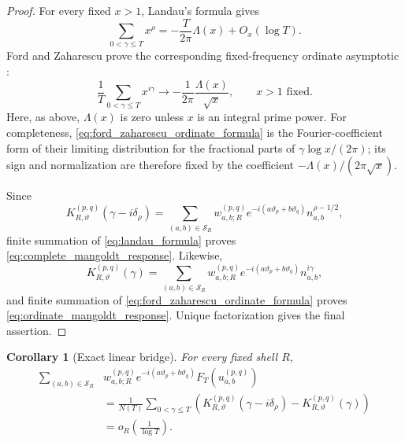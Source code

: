 \documentclass[11pt]{amsart}
\numberwithin{equation}{section}
\theoremstyle{plain}
\newtheorem{corollary}[theorem]{Corollary}
\theoremstyle{definition}
\theoremstyle{remark}
\begin{document}
\begin{proof}
For every fixed $x>1$, Landau's formula gives \cite{Titchmarsh1986}
\begin{equation}
\sum_{0<\gamma\leq T}x^\rho
=
-\frac{T}{2\pi}\Lambda(x)+O_x(\log T).
\label{eq:landau_formula}
\end{equation}
Ford and Zaharescu prove the corresponding fixed-frequency ordinate asymptotic
\cite{FordZaharescu2005}:
\begin{equation}
\frac{1}{T}
\sum_{0<\gamma\leq T}x^{i\gamma}
\longrightarrow
-\frac{1}{2\pi}\frac{\Lambda(x)}{\sqrt{x}},
\qquad x>1 \text{ fixed}.
\label{eq:ford_zaharescu_ordinate_formula}
\end{equation}
Here, as above, $\Lambda(x)$ is zero unless $x$ is an integral prime power.
For completeness, \eqref{eq:ford_zaharescu_ordinate_formula} is the Fourier-coefficient
form of their limiting distribution for the fractional parts of
$\gamma\log x/(2\pi)$; its sign and normalization are therefore fixed by the
coefficient $-\Lambda(x)/(2\pi\sqrt{x})$.

Since
\begin{equation}
K_{R,\vartheta}^{(p,q)}(\gamma-i\delta_\rho)
=
\sum_{(a,b)\in\mathcal S_R}
w_{a,b;R}^{(p,q)}e^{-i(a\vartheta_p+b\vartheta_q)}
n_{a,b}^{\rho-1/2},
\label{eq:complete_kernel_expansion}
\end{equation}
finite summation of \eqref{eq:landau_formula} proves
\eqref{eq:complete_mangoldt_response}.  Likewise,
\begin{equation}
K_{R,\vartheta}^{(p,q)}(\gamma)
=
\sum_{(a,b)\in\mathcal S_R}
w_{a,b;R}^{(p,q)}e^{-i(a\vartheta_p+b\vartheta_q)}
n_{a,b}^{i\gamma},
\label{eq:ordinate_kernel_expansion}
\end{equation}
and finite summation of \eqref{eq:ford_zaharescu_ordinate_formula} proves
\eqref{eq:ordinate_mangoldt_response}.  Unique factorization gives the final assertion.
\end{proof}

\begin{corollary}[Exact linear bridge]
\label{cor:linear_bridge}
For every fixed shell $R$,
\begin{align}
\sum_{(a,b)\in\mathcal S_R}
&w_{a,b;R}^{(p,q)}e^{-i(a\vartheta_p+b\vartheta_q)}
F_T\!\left(u_{a,b}^{(p,q)}\right)
\label{eq:linear_bridge_F}
\\
&=
\frac1{N(T)}
\sum_{0<\gamma\leq T}
\left(
K_{R,\vartheta}^{(p,q)}(\gamma-i\delta_\rho)
-K_{R,\vartheta}^{(p,q)}(\gamma)
\right)
\label{eq:linear_bridge_kernel}
\\
&=o_R\!\left(\frac1{\log T}\right).
\label{eq:linear_bridge_asymptotic}
\end{align}
\end{corollary}
\end{document}
